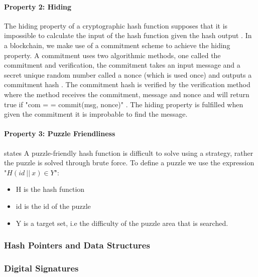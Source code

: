\paragraph{Property 2: Hiding}

The hiding property of a cryptographic hash function supposes that it is impossible to calculate the input of the hash function given the hash output \autocite{narayananBitcoinCryptocurrencyTechnologies2016}. In a blockchain, we make use of a commitment scheme to achieve the hiding property. A commitment uses two algorithmic methods, one called the commitment and verification, the commitment takes an input message and a secret unique random number called a nonce (which is used once) and outputs a commitment hash \autocite{yagaBlockchainTechnologyOverview2018}. The commitment hash is verified by the verification method where the method receives the commitment, message and nonce and will return true if "com = = commit(msg, nonce)" \autocite{narayananBitcoinCryptocurrencyTechnologies2016}. The hiding property is fulfilled when given the commitment it is improbable to find the message.

\paragraph{Property 3: Puzzle Friendliness}

\autocite{narayananBitcoinCryptocurrencyTechnologies2016} states A puzzle-friendly hash function is difficult to solve using a strategy, rather the puzzle is solved through brute force. To define a puzzle we use the expression "\(H(id \ || \ x) \in Y \)":

\begin{itemize}
    \item H is the hash function
    \item id is the id of the puzzle
    \item Y is a target set, i.e the difficulty of the puzzle area that is searched.
\end{itemize}

\subsubsection{Hash Pointers and Data Structures}

\subsubsection{Digital Signatures}

